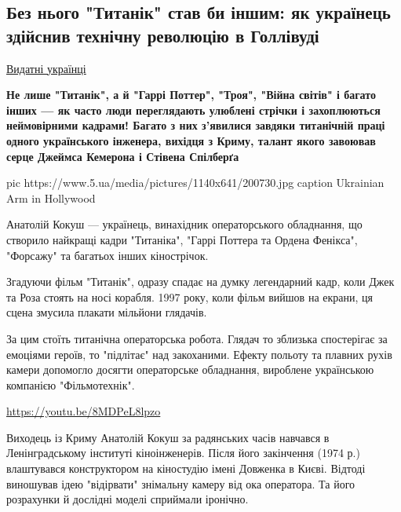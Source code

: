  
 
 

\subsection{Без нього "Титанік" став би іншим: як українець здійснив технічну революцію в Голлівуді}
\label{sec:16_11_2020.news.ua.5ua.1.kokush_titanik}


\href{https://www.5.ua/spetstemy/154/}{Видатні українці}

{\bfseries
Не лише "Титанік", а й "Гаррі Поттер", "Троя", "Війна світів" і багато
інших --- як часто люди переглядають улюблені стрічки і захоплюються
неймовірними кадрами! Багато з них з'явилися завдяки титанічній праці
одного українського інженера, вихідця з Криму, талант якого завоював серце
Джеймса Кемерона і Стівена Спілберґа
}

\ifcmt
pic https://www.5.ua/media/pictures/1140x641/200730.jpg
caption Ukrainian Arm in Hollywood
\fi

Анатолій Кокуш --- українець, винахідник операторського обладнання, що
створило найкращі кадри "Титаніка", "Гаррі Поттера та Ордена Фенікса",
"Форсажу" та багатьох інших кінострічок.

Згадуючи фільм "Титанік", одразу спадає на думку легендарний кадр, коли
Джек та Роза стоять на носі корабля. 1997 року, коли фільм вийшов на
екрани, ця сцена змусила плакати мільйони глядачів.

За цим стоїть титанічна операторська робота. Глядач то зблизька
спостерігає за емоціями героїв, то "підлітає" над закоханими. Ефекту
польоту та плавних рухів камери допомогло досягти операторське обладнання,
вироблене українською компанією "Фільмотехнік".

\url{https://youtu.be/8MDPeL8lpzo}

Виходець із Криму Анатолій Кокуш за радянських часів навчався в
Ленінградському інституті кіноінженерів. Після його закінчення (1974 р.)
влаштувався конструктором на кіностудію імені Довженка в Києві. Відтоді
виношував ідею "відірвати" знімальну камеру від ока оператора. Та його
розрахунки й дослідні моделі сприймали іронічно.

